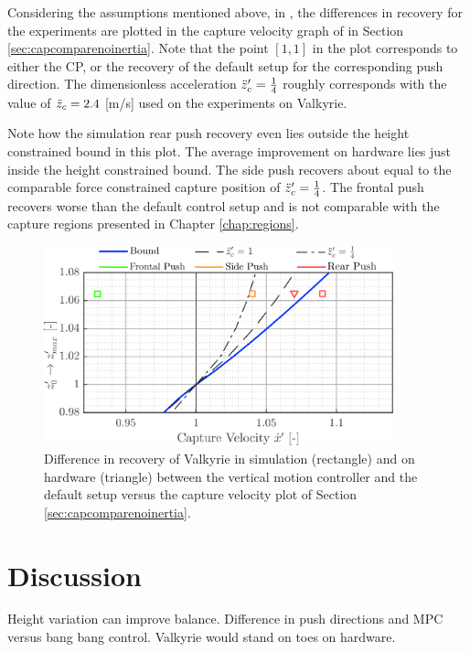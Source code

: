 Considering the assumptions mentioned above, in , the differences in recovery for the experiments are plotted in the capture velocity graph of  in Section \ref{sec:capcomparenoinertia}. Note that the point $[1,1]$ in the plot corresponds to either the \ac{CP}, or the recovery of the default setup for the corresponding push direction. The dimensionless acceleration $\ddot{z}_{c}'=\frac{1}{4}$ roughly corresponds with the value of $\ddot{z}_{c}=2.4$ [m/s] used on the experiments on Valkyrie. 

Note how the simulation rear push recovery even lies outside the height constrained bound in this plot. The average improvement on hardware lies just inside the height constrained bound. The side push recovers about equal to the comparable force constrained capture position of $\ddot{z}_{c}'=\frac{1}{4}$. The frontal push recovers worse than the default control setup and is not comparable with the capture regions presented in Chapter \ref{chap:regions}.
\begin{figure}[h]
\centering
\includegraphics[width=0.9\textwidth]{STYLESTUFF/regioncomparison.png}
\caption{Difference in recovery of Valkyrie in simulation (rectangle) and on hardware (triangle) between the vertical motion controller and the default setup versus the capture velocity plot of Section \ref{sec:capcomparenoinertia}.}
\label{fig:regioncomparison}
\end{figure}

\section{Discussion}
Height variation can improve balance. Difference in push directions and \ac{MPC} versus bang bang control. Valkyrie would stand on toes on hardware.